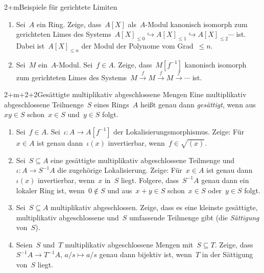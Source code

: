 \documentclass{uebblatt}
\begin{document}

\begin{aufgabe}{2+m}{Beispiele für gerichtete Limiten}
\begin{enumerate}
\item Sei~$A$ ein Ring. Zeige, dass~$A[X]$ als~$A$-Modul kanonisch isomorph zum
gerichteten Limes des Systems~$A[X]_{\leq0} \hookrightarrow A[X]_{\leq1}
\hookrightarrow A[X]_{\leq2} \cdots$ ist. Dabei ist~$A[X]_{\leq n}$ der Modul
der Polynome vom Grad~$\leq n$.
\item Sei~$M$ ein~$A$-Modul. Sei~$f \in A$. Zeige, dass~$M[f^{-1}]$ kanonisch
isomorph zum gerichteten Limes des Systems~$M \xrightarrow{f} M \xrightarrow{f}
M \xrightarrow{f} \cdots$ ist.
\end{enumerate}
\end{aufgabe}

\begin{aufgabe}{2+m+2+2}{Gesättigte multiplikativ abgeschlossene Mengen}
Eine multiplikativ abgeschlossene Teilmenge~$S$ eines Rings~$A$ heißt genau dann
\emph{gesättigt}, wenn aus~$xy \in S$ schon~$x \in S$ und~$y \in S$ folgt.
\begin{enumerate}
\item Sei~$f \in A$. Sei~$\iota : A \to A[f^{-1}]$ der
Lokalisierungsmorphismus. Zeige: Für~$x \in A$ ist genau dann~$\iota(x)$
invertierbar, wenn~$f \in \sqrt{(x)}$.
\item Sei~$S \subseteq A$ eine gesättigte multiplikativ abgeschlossene
Teilmenge und~$\iota : A \to S^{-1}A$ die zugehörige Lokalisierung.
Zeige: Für~$x \in A$ ist genau dann~$\iota(x)$ invertierbar,
wenn~$x$ in~$S$ liegt.
Folgere, dass~$S^{-1}A$ genau dann ein lokaler Ring ist, wenn~$0 \not\in S$ und aus~$x + y \in S$
schon~$x \in S$ oder~$y \in S$ folgt.
\item Sei~$S \subseteq A$ multiplikativ abgeschlossen.
Zeige, dass es eine kleinste gesättigte, mul\-ti\-pli\-ka\-tiv abgeschlossene und~$S$
umfassende Teilmenge gibt (die \emph{Sättigung} von~$S$). 
\item Seien~$S$ und~$T$ multiplikativ abgeschlossene Mengen mit~$S \subseteq
T$. Zeige, dass~$S^{-1}A \to T^{-1}A,\,a/s \mapsto a/s$ genau
dann bijektiv ist, wenn~$T$ in der Sättigung von~$S$ liegt.
\end{enumerate}
\end{aufgabe}
\end{document}
